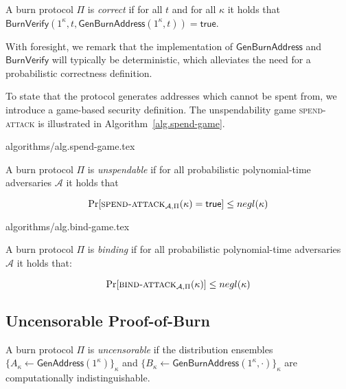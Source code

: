 \begin{definition}[Correctness]
  A burn protocol $\Pi$ is \emph{correct} if for all $t$ and for all $\kappa$ it holds that
  $\mathsf{BurnVerify}(1^\kappa, t, \mathsf{GenBurnAddress}(1^\kappa, t)) = \textsf{true}$.
\end{definition}

With foresight, we remark that the implementation of $\mathsf{GenBurnAddress}$ and $\mathsf{BurnVerify}$ will typically be deterministic, which alleviates the need for a probabilistic correctness definition.

To state that the protocol generates addresses which cannot be spent from, we introduce a game-based security definition. The unspendability game \textsc{spend-attack} is illustrated in Algorithm~\ref{alg.spend-game}.

{algorithms/alg.spend-game.tex}

\begin{definition}[Unspendability]
  A burn protocol $\Pi$ is \emph{unspendable} if
  for all probabilistic polynomial-time adversaries $\mathcal{A}$
  it holds that

  \[
    \Pr[\textsc{spend-attack}_{\mathcal{A},
    \Pi}(\kappa) = \textsf{true}] \leq negl(\kappa)
  \]
\end{definition}

{algorithms/alg.bind-game.tex}

\begin{definition}[Binding]
  A burn protocol $\Pi$ is \emph{binding} if
  for all probabilistic polynomial-time adversaries $\mathcal{A}$ it holds that:

  \[
    \Pr[\textsc{bind-attack}_{\mathcal{A},\Pi}(\kappa)] \leq negl(\kappa)
  \]
\end{definition}

\subsection{Uncensorable Proof-of-Burn}

\begin{definition}[Uncensorability]
  A burn protocol $\Pi$ is \emph{uncensorable} if
  the distribution ensembles $\{A_\kappa \gets \mathsf{GenAddress}(1^\kappa)\}_\kappa$ and
  $\{B_\kappa \gets \mathsf{GenBurnAddress}(1^\kappa, \cdot)\}_\kappa$ are computationally indistinguishable.
\end{definition}
